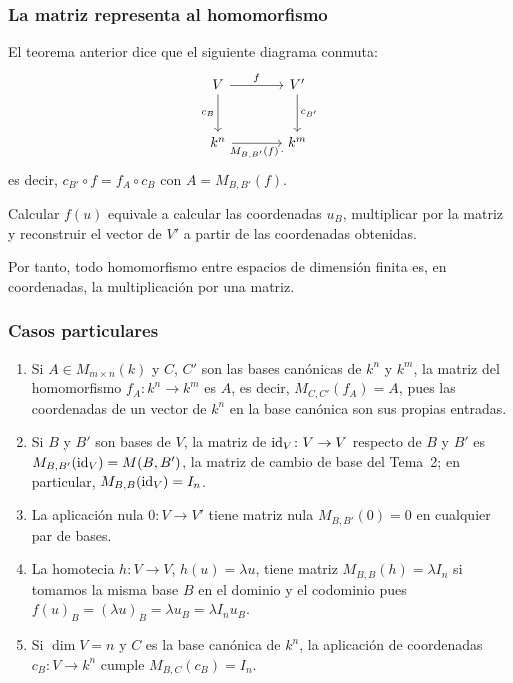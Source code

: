 \begin{frame}[fragile]
    \frametitle{La matriz representa al homomorfismo}

    El teorema anterior dice que el siguiente diagrama
    \alert{conmuta}:
    \[
        \begin{tikzcd}[column sep=large,row sep=large]
            V\arrow[r,"f"]\arrow[d,"c_B"'] & V'\arrow[d,"c_{B'}"]\\
            k^n\arrow[r,"{M_{B,B'}(f)\,\cdot}"'] & k^m
        \end{tikzcd}
    \]
    es decir, $c_{B'}\circ f=f_A\circ c_B$ con $A=M_{B,B'}(f)$.

    \medskip

    Calcular $f(u)$ equivale a calcular las coordenadas $u_B$, multiplicar
    por la matriz y reconstruir el vector de $V'$ a partir de las
    coordenadas obtenidas.

    \medskip

    Por tanto, \alert{todo} homomorfismo entre espacios de dimensión finita
    es, en coordenadas, la multiplicación por una matriz.
\end{frame}


\begin{frame}
    \frametitle{Casos particulares}

    \begin{example}
        \begin{enumerate}
            \item Si $A\in M_{m\times n}(k)$ y $C$, $C'$ son las bases
            canónicas de $k^n$ y $k^m$, la matriz del homomorfismo
            $f_A\colon k^n\to k^m$ es $A$, es decir, $M_{C,C'}(f_A)=A$, pues las coordenadas de un
            vector de $k^n$ en la base canónica son sus propias entradas.
            \item Si $B$ y $B'$ son bases de $V$, la matriz de
            $\operatorname{id}_V\colon V\to V$ respecto de $B$ y $B'$ es
            $M_{B,B'}(\operatorname{id}_V)=M(B,B')$, la \alert{matriz de cambio de base}
            del Tema~2; en particular, $M_{B,B}(\operatorname{id}_V)=I_n$.
            \item La aplicación nula $0\colon V\to V'$ tiene matriz nula $M_{B,B'}(0)=0$ en
            cualquier par de bases.
            \item La homotecia $h\colon V\to V$, $h(u)=\lambda u$, tiene
            matriz $M_{B,B}(h)=\lambda I_n$ si tomamos la misma base $B$ en el dominio y el codominio pues $f(u)_B=(\lambda u)_B=\lambda u_B=\lambda I_n u_B$.
            \item Si $\dim V=n$ y $C$ es la base canónica de $k^n$, la
            aplicación de coordenadas $c_B\colon V\to k^n$ cumple
            $M_{B,C}(c_B)=I_n$.
        \end{enumerate}
    \end{example}
\end{frame}


